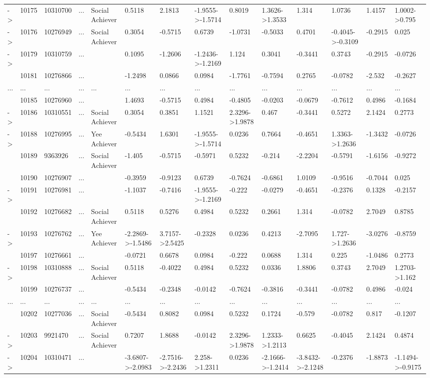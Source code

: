 \documentclass[6pt]{article}
\begin{document}
\begin{landscape}
{\begin{longtable}{llllllllllllll}
-\textgreater &10175&10310700&...&Social Achiever&0.5118&2.1813&-1.9555-\textgreater -1.5714&0.8019&1.3626-\textgreater 1.3533&1.314&1.0736&1.4157&1.0002-\textgreater 0.795\tabularnewline
-\textgreater &10176&10276949&...&Social Achiever&0.3054&-0.5715&0.6739&-1.0731&-0.5033&0.4701&-0.4045-\textgreater -0.3109&-0.2915&0.025\tabularnewline
-\textgreater &10179&10310759&...&&0.1095&-1.2606&-1.2436-\textgreater -1.2169&1.124&0.3041&-0.3441&0.3743&-0.2915&-0.0726\tabularnewline
&10181&10276866&...&&-1.2498&0.0866&0.0984&-1.7761&-0.7594&0.2765&-0.0782&-2.532&-0.2627\tabularnewline
...&...&...&...&...&...&...&...&...&...&...&...&...&...\tabularnewline
&10185&10276960&...&&1.4693&-0.5715&0.4984&-0.4805&-0.0203&-0.0679&-0.7612&0.4986&-0.1684\tabularnewline
-\textgreater &10186&10310551&...&Social Achiever&0.3054&0.3851&1.1521&2.3296-\textgreater 1.9878&0.467&-0.3441&0.5272&2.1424&0.2773\tabularnewline
-\textgreater &10188&10276995&...&Yee Achiever&-0.5434&1.6301&-1.9555-\textgreater -1.5714&0.0236&0.7664&-0.4651&1.3363-\textgreater 1.2636&-1.3432&-0.0726\tabularnewline
&10189&9363926&...&Social Achiever&-1.405&-0.5715&-0.5971&0.5232&-0.214&-2.2204&-0.5791&-1.6156&-0.9272\tabularnewline
&10190&10276907&...&&-0.3959&-0.9123&0.6739&-0.7624&-0.6861&1.0109&-0.9516&-0.7044&0.025\tabularnewline
-\textgreater &10191&10276981&...&&-1.1037&-0.7416&-1.9555-\textgreater -1.2169&-0.222&-0.0279&-0.4651&-0.2376&0.1328&-0.2157\tabularnewline
&10192&10276682&...&Social Achiever&0.5118&0.5276&0.4984&0.5232&0.2661&1.314&-0.0782&2.7049&0.8785\tabularnewline
-\textgreater &10193&10276762&...&Yee Achiever&-2.2869-\textgreater -1.5486&3.7157-\textgreater 2.5425&-0.2328&0.0236&0.4213&-2.7095&1.727-\textgreater 1.2636&-3.0276&-0.8759\tabularnewline
&10197&10276661&...&&-0.0721&0.6678&0.0984&-0.222&0.0688&1.314&0.225&-1.0486&0.2773\tabularnewline
-\textgreater &10198&10310888&...&Social Achiever&0.5118&-0.4022&0.4984&0.5232&0.0336&1.8806&0.3743&2.7049&1.2703-\textgreater 1.162\tabularnewline
&10199&10276737&...&&-0.5434&-0.2348&-0.0142&-0.7624&-0.3816&-0.3441&-0.0782&0.4986&-0.024\tabularnewline
...&...&...&...&...&...&...&...&...&...&...&...&...&...\tabularnewline
&10202&10277036&...&Social Achiever&-0.5434&0.8082&0.0984&0.5232&0.1724&-0.579&-0.0782&0.817&-0.1207\tabularnewline
-\textgreater &10203&9921470&...&Social Achiever&0.7207&1.8688&-0.0142&2.3296-\textgreater 1.9878&1.2333-\textgreater 1.2113&0.6625&-0.4045&2.1424&0.4874\tabularnewline
-\textgreater &10204&10310471&...&&-3.6807-\textgreater -2.0983&-2.7516-\textgreater -2.2436&2.258-\textgreater 1.2311&0.0236&-2.1666-\textgreater -1.2414&-3.8432-\textgreater -2.1248&-0.2376&-1.8873&-1.1494-\textgreater -0.9175\tabularnewline

\end{longtable}}
\end{landscape}
\end{document}
